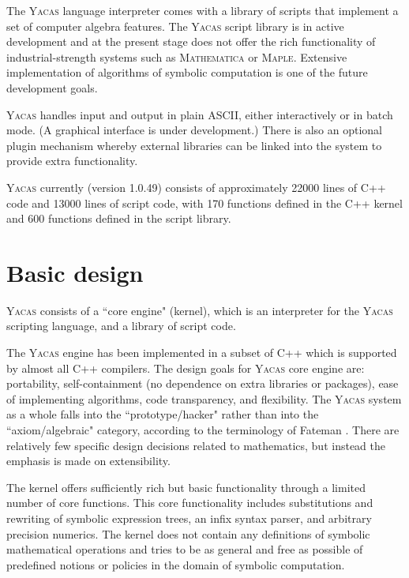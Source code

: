 \documentclass{llncs}
\begin{document}
The \textsc{Yacas} language interpreter comes with a library of scripts that implement a set of computer algebra features. The \textsc{Yacas} script library
is in active development and at the present stage does not offer the rich functionality of
industrial-strength systems such as \textsc{Mathematica} or \textsc{Maple}.
Extensive
implementation of algorithms of symbolic computation is one of the future
development goals.

\textsc{Yacas} handles input and output in plain ASCII,
either interactively or in batch mode. (A graphical interface is under development.) There is also an optional plugin mechanism
whereby external libraries can be linked into the system to provide extra
functionality.

\textsc{Yacas} currently (version 1.0.49) consists of approximately 22000 lines of C++ code and  13000 lines of 
script code, with 170 functions defined in the C++ kernel and 600 functions
defined in the script library.


\section{Basic design}

\textsc{Yacas} consists of a ``core engine" (kernel), which is an interpreter
for the \textsc{Yacas} scripting language, and a library of script code.

The
\textsc{Yacas} engine has been implemented in a subset of C++ which is
supported by almost all C++ compilers.
The design goals for \textsc{Yacas} core engine are: portability,
self-containment (no dependence on extra libraries or packages), ease of
implementing algorithms, code transparency, and flexibility. The \textsc{Yacas}
system as a whole falls into the ``prototype/hacker" rather than into the
``axiom/algebraic" category, according to the terminology of Fateman
\cite{F90}. There are relatively few specific design decisions related to
mathematics, but instead the emphasis is made on extensibility.


The kernel offers sufficiently rich but basic functionality through a limited
number of core functions. This core functionality includes substitutions and
rewriting of symbolic expression trees, an infix syntax parser, and arbitrary
precision numerics. The kernel does not contain any definitions of symbolic
mathematical operations and tries to be as general and free as possible of
predefined notions or policies in the domain of symbolic computation.
\end{document}
